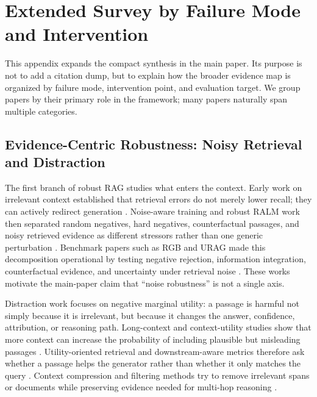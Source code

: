 \section{Extended Survey by Failure Mode and Intervention}
\label{sec:extended-survey}

This appendix expands the compact synthesis in the main paper. Its purpose is not to add a citation dump, but to explain how the broader evidence map is organized by failure mode, intervention point, and evaluation target. We group papers by their primary role in the framework; many papers naturally span multiple categories.

\subsection{Evidence-Centric Robustness: Noisy Retrieval and Distraction}

The first branch of robust RAG studies what enters the context. Early work on irrelevant context established that retrieval errors do not merely lower recall; they can actively redirect generation \citep{irrelevantContext2023}. Noise-aware training and robust RALM work then separated random negatives, hard negatives, counterfactual passages, and noisy retrieved evidence as different stressors rather than one generic perturbation \citep{raat2024,rrag037,rrag091}. Benchmark papers such as RGB and URAG made this decomposition operational by testing negative rejection, information integration, counterfactual evidence, and uncertainty under retrieval noise \citep{rgb2023,rrag001}. These works motivate the main-paper claim that ``noise robustness'' is not a single axis.

Distraction work focuses on negative marginal utility: a passage is harmful not simply because it is irrelevant, but because it changes the answer, confidence, attribution, or reasoning path. Long-context and context-utility studies show that more context can increase the probability of including plausible but misleading passages \citep{rrag003,rrag039,rrag032}. Utility-oriented retrieval and downstream-aware metrics therefore ask whether a passage helps the generator rather than whether it only matches the query \citep{rrag058,rrag067,rrag073,rrag081,rrag088}. Context compression and filtering methods try to remove irrelevant spans or documents while preserving evidence needed for multi-hop reasoning \citep{rrag044,chainOfNote2023,sufficientContext2024,rrag043,rrag048,rrag055}.

